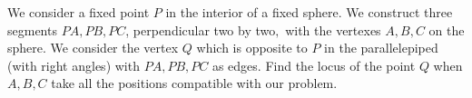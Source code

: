 We consider a fixed point $P$ in the interior of a fixed sphere$.$ We construct three segments $PA, PB,PC$,  perpendicular two by two$,$ with the vertexes $A, B, C$ on the sphere$.$ We consider the vertex $Q$ which is opposite to $P$ in the parallelepiped (with right angles) with $PA, PB, PC$ as edges$.$ Find the locus of the point $Q$ when $A, B, C$ take all the positions compatible with our problem.